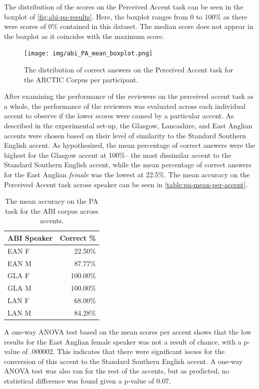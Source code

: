 \documentclass
[
    a4paper,
    twoside,
    12pt,
]
{report}
\begin{document}
The distribution of the scores on the Perceived Accent task can be seen
in the boxplot of \autoref{fig:abi-pa-results}. Here, the boxplot ranges
from 0 to 100\% as there were scores of 0\% contained in this dataset.
The median score does not appear in the boxplot as it coincides with the
maximum score.

\begin{figure}[]
\centering
\texttt{[image: img/abi\_PA\_mean\_boxplot.png]}
\caption{The distribution of correct answers on the Perceived Accent task for the ARCTIC Corpus per participant.}
\label{fig:abi-pa-results}
\end{figure}

After examining the performance of the reviewers on the perceived accent
task as a whole, the performance of the reviewers was evaluated across
each individual accent to observe if the lower scores were caused by a
particular accent. As described in the experimental set-up, the Glasgow,
Lancashire, and East Anglian accents were chosen based on their level of
similarity to the Standard Southern English accent. As hypothesized, the
mean percentage of correct answers were the highest for the Glasgow
accent at 100\%-- the most dissimilar accent to the Standard Southern
English accent, while the mean percentage of correct answers for the
East Anglian \emph{female} was the lowest at 22.5\%. The mean accuracy
on the Perceived Accent task across speaker can be seen in
\autoref{table:pa-mean-per-accent}.

\begin{table}[]
\centering
\begin{tabular}{|l|r|}
\hline
\textbf{ABI Speaker} & \textbf{Correct \%} \\ \hline
EAN F                & 22.50\%             \\ \hline
EAN M                & 87.77\%             \\ \hline
GLA F                & 100.00\%            \\ \hline
GLA M                & 100.00\%            \\ \hline
LAN F                & 68.00\%             \\ \hline
LAN M                & 84.28\%             \\ \hline
\end{tabular}
\caption{The mean accuracy on the PA task for the ABI corpus across accents.}
\label{table:pa-mean-per-accent}
\end{table}

A one-way ANOVA test based on the mean scores per accent shows that the
low results for the East Anglian female speaker was not a result of
chance, with a p-value of .000002. This indicates that there were
significant issues for the conversion of this accent to the Standard
Southern English accent. A one-way ANOVA test was also ran for the rest
of the accents, but as predicted, no statistical difference was found
given a p-value of 0.07.
\end{document}
